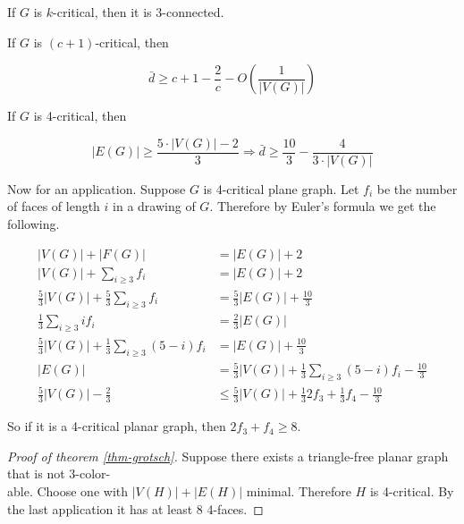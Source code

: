 \begin{observ}
	If $G$ is $k$-critical, then it is $3$-connected.
\end{observ}

\begin{thm}
	If $G$ is $(c+1)$-critical, then
	
	$$
	\bar{d} \geq c+1 - \frac{2}{c} - O\left( \frac{1}{|V(G)|}\right)
	$$
\end{thm}

\begin{thm}
	If $G$ is 4-critical, then
	
	$$
	|E(G)| \geq \frac{5 \cdot |V(G)| - 2}{3} \Rightarrow \bar{d} \geq \frac{10}{3} - \frac{4}{3 \cdot |V(G)|}
	$$
\end{thm}

Now for an application. Suppose $G$ is 4-critical plane graph. Let $f_i$ be the number of faces of length $i$ in a drawing of $G$. Therefore by Euler's formula we get the following.

$$
\begin{aligned}
	|V(G)| + |F(G)| &= |E(G)| + 2 \\
	|V(G)| + \sum_{i \geq 3} f_i &= |E(G)| + 2 \\
	\frac{5}{3}|V(G)| + \frac{5}{3}\sum_{i \geq 3} f_i &= \frac{5}{3}|E(G)| + \frac{10}{3} \\
	\frac{1}{3} \sum_{i \geq 3} i f_i &= \frac{2}{3} |E(G)| \\
	\frac{5}{3}|V(G)| + \frac{1}{3} \sum_{i \geq 3} (5-i) f_i &= |E(G)| + \frac{10}{3} \\
	|E(G)| &= \frac{5}{3} |V(G)| + \frac{1}{3} \sum_{i \geq 3} (5-i) f_i - \frac{10}{3} \\
	\frac{5}{3} |V(G)| - \frac{2}{3} &\leq \frac{5}{3} |V(G)| + \frac{1}{3} 2f_3 + \frac{1}{3} f_4 - \frac{10}{3}
\end{aligned}
$$

So if it is a 4-critical planar graph, then $2f_3 + f_4 \geq 8$.

\begin{proof}[Proof of theorem \ref{thm-grotsch}]
	Suppose there exists a triangle-free planar graph that is not 3-color-\\able. Choose one with $|V(H)| + |E(H)|$ minimal. Therefore $H$ is 4-critical. By the last application it has at least $8$ 4-faces.
\end{proof}